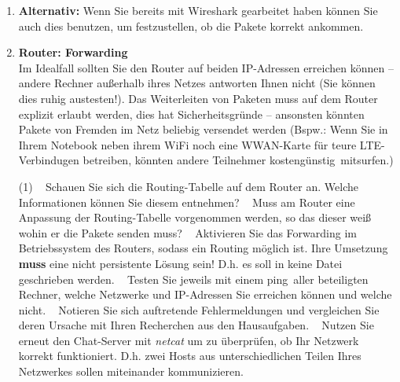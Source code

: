 \documentclass[paper=a4,fontsize=11pt]{scrartcl}%
\numberwithin{equation}{section}
\begin{document}
\begin{enumerate}
		\begin{lstlisting}[style=Bash, language=Bash, label={netcat_client}]
#Client 
nc <ip_of_server> <port_number>
#example
nc 10.0.0.1 4711
		\end{lstlisting}
		\item \textbf{Alternativ:} Wenn Sie bereits mit Wireshark gearbeitet haben können Sie auch dies benutzen, um festzustellen, ob die Pakete korrekt ankommen. 
	\item \textbf{Router: Forwarding}\\
	Im Idealfall sollten Sie den Router auf beiden IP-Adressen erreichen können -- andere Rechner außerhalb ihres Netzes antworten Ihnen nicht (Sie können dies ruhig austesten!). Das Weiterleiten von Paketen muss auf dem Router explizit erlaubt werden, dies hat Sicherheitsgründe -- ansonsten könnten Pakete von Fremden im Netz beliebig versendet werden (Bspw.: Wenn Sie in Ihrem Notebook neben ihrem WiFi noch eine WWAN-Karte für teure LTE-Verbindugen betreiben, könnten andere Teilnehmer \glqq kostengünstig\grqq\ mitsurfen.)
	\begin{tasks}(1)
		\task~ Schauen Sie sich die Routing-Tabelle auf dem Router an. Welche Informationen können Sie diesem entnehmen?
        \task~ Muss am Router eine Anpassung der Routing-Tabelle vorgenommen werden, so das dieser weiß wohin er die Pakete senden muss?
        \task~ Aktivieren Sie das Forwarding im Betriebssystem des Routers, sodass ein Routing möglich ist. Ihre Umsetzung \textbf{muss} eine nicht persistente Lösung sein! D.h. es soll in keine Datei geschrieben werden.
		\task~ Testen Sie jeweils mit einem \glqq ping\grqq\ aller beteiligten Rechner, welche Netzwerke und IP-Adressen Sie erreichen können und welche nicht.
		\task~ Notieren Sie sich auftretende Fehlermeldungen und vergleichen Sie deren Ursache mit Ihren Recherchen aus den Hausaufgaben.
		\task~ Nutzen Sie erneut den Chat-Server mit \emph{netcat} um zu überprüfen, ob Ihr Netzwerk korrekt funktioniert. D.h. zwei Hosts aus unterschiedlichen Teilen Ihres Netzwerkes sollen miteinander kommunizieren.
	\end{tasks}
	

\end{enumerate}
\end{document}
